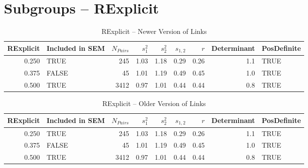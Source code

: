 \documentclass{article}\usepackage{graphicx, color}
\begin{document}
\section{Subgroups --  RExplicit }%
\begin{table}[ht]
\begin{center}
\begin{tabular}{rlrrrrrrl}
  \hline
RExplicit & Included in SEM & $N_{Pairs}$ & $s_1^2$ & $s_2^2$ & $s_{1,2}$ & $r$ & Determinant & PosDefinite \\ 
  \hline
0.250 & TRUE & 245 & 1.03 & 1.18 & 0.29 & 0.26 & 1.1 & TRUE \\ 
  0.375 & FALSE & 45 & 1.01 & 1.19 & 0.49 & 0.45 & 1.0 & TRUE \\ 
  0.500 & TRUE & 3412 & 0.97 & 1.01 & 0.44 & 0.44 & 0.8 & TRUE \\ 
   \hline
\end{tabular}
\caption{RExplicit -- Newer Version of Links}
\end{center}
\end{table}
\begin{table}[ht]
\begin{center}
\begin{tabular}{rlrrrrrrl}
  \hline
RExplicit & Included in SEM & $N_{Pairs}$ & $s_1^2$ & $s_2^2$ & $s_{1,2}$ & $r$ & Determinant & PosDefinite \\ 
  \hline
0.250 & TRUE & 245 & 1.03 & 1.18 & 0.29 & 0.26 & 1.1 & TRUE \\ 
  0.375 & FALSE & 45 & 1.01 & 1.19 & 0.49 & 0.45 & 1.0 & TRUE \\ 
  0.500 & TRUE & 3412 & 0.97 & 1.01 & 0.44 & 0.44 & 0.8 & TRUE \\ 
   \hline
\end{tabular}
\caption{RExplicit -- Older Version of Links}
\end{center}
\end{table}
\end{document}
